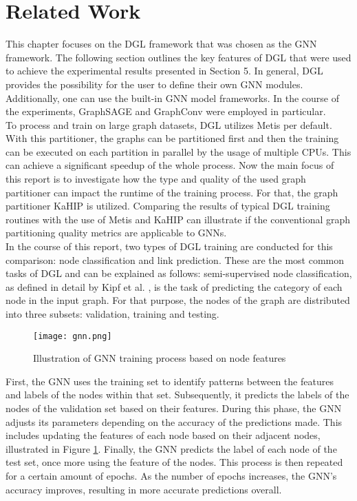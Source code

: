 \documentclass[acmsmall,nonacm,screen,review]{acmart}
\begin{document}
\section{Related Work}
This chapter focuses on the DGL framework that was chosen as the GNN framework. The following section outlines the key features of DGL that were used to achieve the experimental results presented in Section 5. In general, DGL provides the possibility for the user to define their own GNN modules. Additionally, one can use the built-in GNN model frameworks. In the course of the experiments, GraphSAGE \cite{GraphSAGE} and GraphConv \cite{NC} were employed in particular. \\
To process and train on large graph datasets, DGL utilizes Metis per default. With this partitioner, the graphs can be partitioned first and then the training can be executed on each partition in parallel by the usage of multiple CPUs. This can achieve a significant speedup of the whole process. Now the main focus of this report is to investigate how the type and quality of the used graph partitioner can impact the runtime of the training process. For that, the graph partitioner KaHIP is utilized. Comparing the results of typical DGL training routines with the use of Metis and KaHIP can illustrate if the conventional graph partitioning quality metrics are applicable to GNNs. \\
In the course of this report, two types of DGL training are conducted for this comparison: node classification and link prediction. These are the most common tasks of DGL and can be explained as follows: semi-supervised node classification, as defined in detail by Kipf et al. \cite{NC}, is the task of predicting the category of each node in the input graph. For that purpose, the nodes of the graph are distributed into three subsets: validation, training and testing. \\  
\begin{figure}[bt!]
    \centering
    \texttt{[image: gnn.png]}
    \caption{Illustration of GNN training process based on node features}
    \label{learning}
\end{figure}
First, the GNN uses the training set to identify patterns between the features and labels of the nodes within that set. Subsequently, it predicts the labels of the nodes of the validation set based on their features. During this phase, the GNN adjusts its parameters depending on the accuracy of the predictions made. This includes updating the features of each node based on their adjacent nodes, illustrated in Figure \ref{learning}. Finally, the GNN predicts the label of each node of the test set, once more using the feature of the nodes. This process is then repeated for a certain amount of epochs. As the number of epochs increases, the GNN's accuracy improves, resulting in more accurate predictions overall. \\
\end{document}
